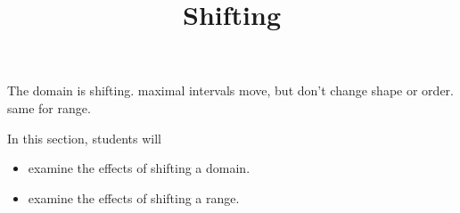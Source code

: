 \documentclass{ximera}
\title{Shifting}
\begin{document}
\begin{abstract}
\end{abstract}
\maketitle





The domain is shifting.  maximal intervals move, but don't change shape or order.  same for range.














\begin{sectionOutcomes}
In this section, students will 

\begin{itemize}
\item examine the effects of shifting a domain.
\item examine the effects of shifting a range.
\end{itemize}
\end{sectionOutcomes}
\end{document}
